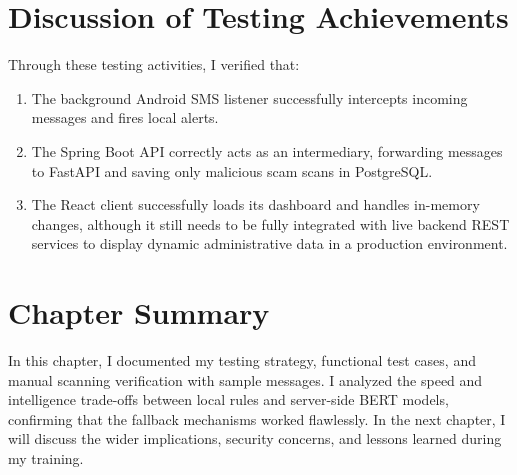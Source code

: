 \section{Discussion of Testing Achievements}
Through these testing activities, I verified that:
\begin{enumerate}
  \item The background Android SMS listener successfully intercepts incoming messages and fires local alerts.
  \item The Spring Boot API correctly acts as an intermediary, forwarding messages to FastAPI and saving only malicious scam scans in PostgreSQL.
  \item The React client successfully loads its dashboard and handles in-memory changes, although it still needs to be fully integrated with live backend REST services to display dynamic administrative data in a production environment.
\end{enumerate}

\section{Chapter Summary}
In this chapter, I documented my testing strategy, functional test cases, and manual scanning verification with sample messages. I analyzed the speed and intelligence trade-offs between local rules and server-side BERT models, confirming that the fallback mechanisms worked flawlessly. In the next chapter, I will discuss the wider implications, security concerns, and lessons learned during my training.
